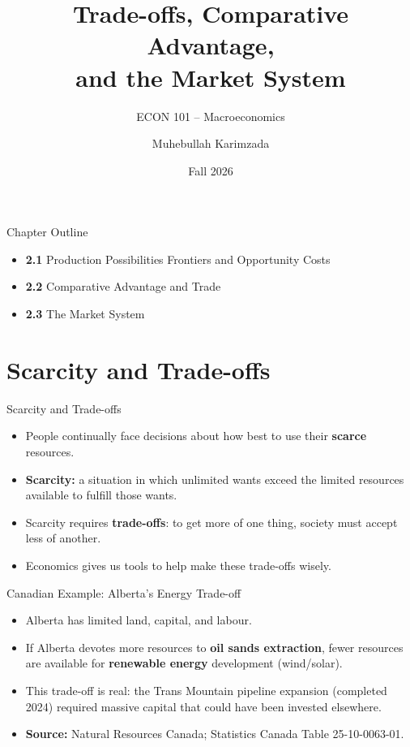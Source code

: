 \documentclass[aspectratio=169]{beamer}
\title{\textbf{Trade-offs, Comparative Advantage,\\ and the Market System}}
\subtitle{{\large ECON 101 -- Macroeconomics}}
\author{Muhebullah Karimzada}
\date{Fall 2026}
\begin{document}

\begin{frame}[plain]
  \titlepage
\end{frame}

\begin{frame}{Chapter Outline}
\transfade
\begin{itemize}
  \item \textbf{2.1} Production Possibilities Frontiers and Opportunity Costs
  \item \textbf{2.2} Comparative Advantage and Trade
  \item \textbf{2.3} The Market System
\end{itemize}
\end{frame}

\section{Scarcity and Trade-offs}

\begin{frame}{Scarcity and Trade-offs}
\transfade
\begin{itemize}
  \item People continually face decisions about how best to use their \textbf{scarce} resources.
  \item \textbf{Scarcity:} a situation in which unlimited wants exceed the limited resources available to fulfill those wants.
  \item Scarcity requires \textbf{trade-offs}: to get more of one thing, society must accept less of another.
  \item Economics gives us tools to help make these trade-offs wisely.
\end{itemize}
\end{frame}

\begin{frame}{Canadian Example: Alberta's Energy Trade-off}
\transfade
\begin{itemize}
  \item Alberta has limited land, capital, and labour.
  \item If Alberta devotes more resources to \textbf{oil sands extraction}, fewer resources are available for \textbf{renewable energy} development (wind/solar).
  \item This trade-off is real: the Trans Mountain pipeline expansion (completed 2024) required massive capital that could have been invested elsewhere.
  \item \textbf{Source:} Natural Resources Canada; Statistics Canada Table 25-10-0063-01.
\end{itemize}
\end{frame}
\end{document}
